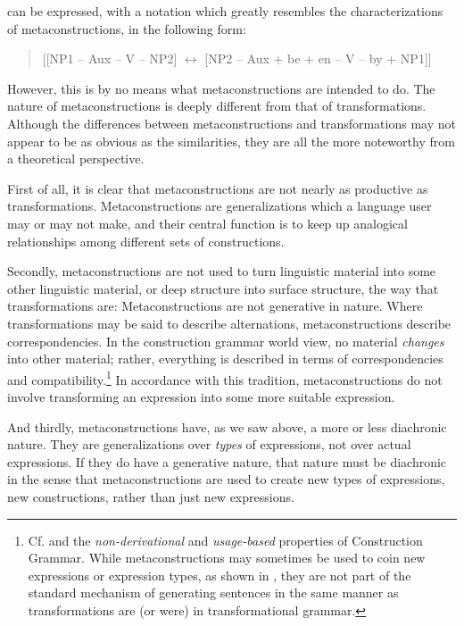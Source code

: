 \documentclass[output=paper, colorlinks,citecolor=brown]{langsci/langscibook}
\begin{document}
can be expressed, with a notation which greatly resembles the characterizations of metaconstructions, in the following form:


\begin{quote}{}
[[NP1 – Aux – V – NP2] $\leftrightarrow $ [NP2 – Aux + be + en – V – by + NP1]]
\end{quote}

However, this is by no means what metaconstructions are intended to do. The nature of metaconstructions is deeply different from that of transformations. Although the differences between metaconstructions and transformations may not appear to be as obvious as the similarities, they are all the more noteworthy from a theoretical perspective.

First of all, it is clear that metaconstructions are not nearly as productive as transformations. Metaconstructions are generalizations which a language user may or may not make, and their central function is to keep up analogical relationships among different sets of constructions.

\begin{sloppypar}
Secondly, metaconstructions are not used to turn linguistic material into some other linguistic material, or deep structure into surface structure, the way that transformations are: Metaconstructions are not generative in nature. Where transformations may be said to describe alternations, metaconstructions describe correspondencies. In the construction grammar world view, no material \textit{changes} into other material; rather, everything is described in terms of correspondencies and compatibility.\footnote{Cf. \citet{Kay1995} and the \textit{non-derivational} and \textit{usage-based} properties of Construction Grammar. While metaconstructions may sometimes be used to coin new expressions or expression types, as shown in , they are not part of the standard mechanism of generating sentences in the same manner as transformations are (or were) in transformational grammar.} In accordance with this tradition, metaconstructions do not involve transforming an expression into some more suitable expression.
\end{sloppypar}

And thirdly, metaconstructions have, as we saw above, a more or less diachronic nature. They are generalizations over \textit{types} of expressions, not over actual expressions. If they do have a generative nature, that nature must be diachronic in the sense that metaconstructions are used to create new types of expressions, new constructions, rather than just new expressions.
\end{document}
